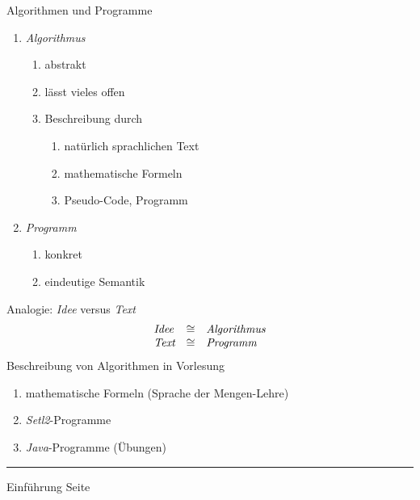 \documentclass{slides}
\newcounter{mypage}
\begin{document}
\begin{slide}{}
\normalsize

\begin{center}
Algorithmen und Programme
\end{center}
\vspace*{0.5cm}

\footnotesize
\begin{enumerate}
\item \emph{Algorithmus}
  \begin{enumerate}
  \item abstrakt
  \item l\"asst vieles offen
  \item Beschreibung durch 
    \begin{enumerate}
    \item nat\"urlich sprachlichen Text
    \item mathematische Formeln
    \item Pseudo-Code, Programm
    \end{enumerate}
  \end{enumerate}
\item \emph{Programm}
  \begin{enumerate}
  \item konkret
  \item eindeutige Semantik
  \end{enumerate}
\end{enumerate}
Analogie: \emph{Idee} versus \emph{Text}
$$
\begin{array}{lcl}
  \emph{Idee} & \cong & \emph{Algorithmus} \\
  \emph{Text} & \cong & \emph{Programm} \\

\end{array}
$$
Beschreibung von Algorithmen in Vorlesung
\begin{enumerate}
\item mathematische Formeln (Sprache der Mengen-Lehre)
\item \textsl{Setl2}-Programme
\item \textsl{Java}-Programme (Übungen)
\end{enumerate}

\vspace*{\fill}
\tiny \addtocounter{mypage}{1}
\rule{17cm}{1mm}
Einf\"uhrung \hspace*{\fill} Seite 
\end{slide}

\end{document}
